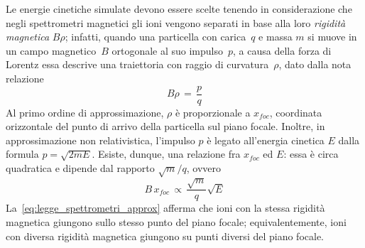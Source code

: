 Le energie cinetiche simulate devono essere scelte tenendo in considerazione che negli spettrometri magnetici gli ioni vengono separati in base alla loro \emph{rigidità magnetica} $B \rho$; infatti, quando una particella con carica~$q$ e massa $m$ si muove in un campo magnetico~$B$ ortogonale al suo impulso~$p$, a causa della forza di Lorentz essa descrive una traiettoria con raggio di curvatura~$\rho$, dato dalla nota relazione
\begin{equation} \label{eq:legge_spettrometri}
B  \rho \, = \,  \frac{p}{q}
\end{equation}
Al primo ordine di approssimazione, $\rho$ è proporzionale a $x_{foc}$, coordinata orizzontale del punto di arrivo della particella sul piano focale.
Inoltre, in approssimazione non relativistica, l'impulso $p$ è legato all'energia cinetica $E$ dalla formula $p = \sqrt{2 m E}$. 
Esiste, dunque, una relazione fra $x_{foc}$ ed $E$: essa è circa quadratica e dipende dal rapporto $\sqrt{m}/q$, ovvero
\begin{equation} \label{eq:legge_spettrometri_approx}
B \, x_{foc} \, \propto \,  \frac{\sqrt{m}}{q} \sqrt{E}
\end{equation}
La~\ref{eq:legge_spettrometri_approx} afferma che ioni con la stessa rigidità magnetica giungono sullo stesso punto del piano focale; equivalentemente, ioni con diversa rigidità magnetica giungono su punti diversi del piano focale.
